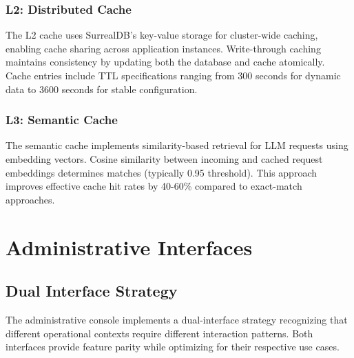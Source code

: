 \documentclass[12pt,a4paper,twoside]{report}
\begin{document}
\subsection{L2: Distributed Cache}

The L2 cache uses SurrealDB's key-value storage for cluster-wide caching, enabling cache sharing across application instances. Write-through caching maintains consistency by updating both the database and cache atomically. Cache entries include TTL specifications ranging from 300 seconds for dynamic data to 3600 seconds for stable configuration.

\subsection{L3: Semantic Cache}

The semantic cache implements similarity-based retrieval for LLM requests using embedding vectors. Cosine similarity between incoming and cached request embeddings determines matches (typically 0.95 threshold). This approach improves effective cache hit rates by 40-60\% compared to exact-match approaches.


\chapter{Administrative Interfaces}

\section{Dual Interface Strategy}

The administrative console implements a dual-interface strategy recognizing that different operational contexts require different interaction patterns. Both interfaces provide feature parity while optimizing for their respective use cases.
\end{document}
